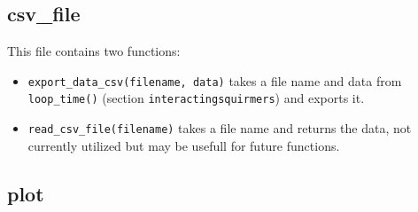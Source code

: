 \documentclass{article}
\begin{document}
\subsection{csv\_file}
This file contains two functions:
\begin{itemize}
   \item \texttt{export\_data\_csv(filename, data)} takes a file name and data from \texttt{loop\_time()} (section \texttt{interactingsquirmers}) and exports it.
   \item \texttt{read\_csv\_file(filename)} takes a file name and returns the data, not currently utilized but may be usefull for future functions.
\end{itemize}

\subsection{plot}
\end{document}
